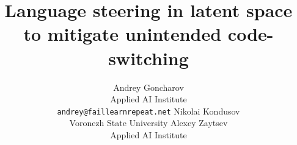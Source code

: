 \documentclass{article}
\begin{document}
\title{Language steering in latent space to mitigate unintended code-switching}

%

\author{
  Andrey Goncharov\\
  Applied AI Institute\\
  \texttt{andrey@faillearnrepeat.net}
  \And
  Nikolai Kondusov\\
  Voronezh State University
  \And
  Alexey Zaytsev\\
  Applied AI Institute
}

\end{document}
